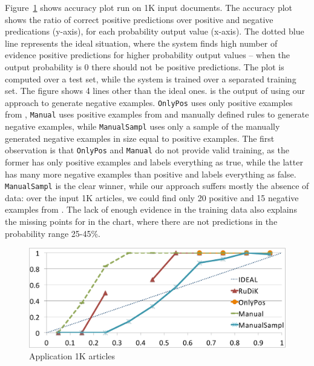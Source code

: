 Figure~\ref{fig:deep_dive_1k} shows \deepdive accuracy plot run on 1K input documents. The accuracy plot shows the ratio of correct positive predictions over positive and negative predications (y-axis), for each probability output value (x-axis). The dotted blue line represents the ideal situation, where the system finds high number of evidence positive predictions for higher probability output values -- when the output probability is 0 there should not be positive predictions. The plot is computed over a test set, while the system is trained over a separated training set. The figure shows 4 lines other than the ideal ones. \krd is the output of \deepdive using our approach to generate negative examples. \texttt{OnlyPos} uses only positive examples from \dbpedia, \texttt{Manual} uses positive examples from \dbpedia and manually defined rules to generate negative examples, while \texttt{ManualSampl} uses only a sample of the manually generated negative examples in size equal to positive examples. The first observation is that \texttt{OnlyPos} and \texttt{Manual} do not provide valid training, as the former has only positive examples and labels everything as true, while the latter has many more negative examples than positive and labels everything as false. \texttt{ManualSampl} is the clear winner, while our approach suffers mostly the absence of data: over the input 1K articles, we could find only 20 positive and 15 negative examples from \dbpedia.
The lack of enough evidence in the training data also explains the missing points for \krd in the chart, where there are not predictions in the probability range 25-45\%.

\begin{figure}[t]
	\centering
	\includegraphics[width=.7\columnwidth]{include/figure/deepDive1K.pdf}
	\caption{\deepdive Application 1K articles}
	\label{fig:deep_dive_1k}
\end{figure}


